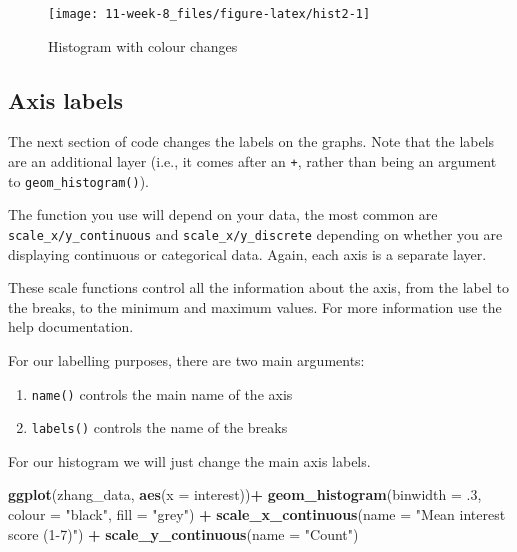 \documentclass[]{book}
\newenvironment{Shaded}{\begin{snugshade}}{\end{snugshade}}
\newcommand{\DataTypeTok}[1]{\textcolor[rgb]{0.13,0.29,0.53}{#1}}
\newcommand{\FloatTok}[1]{\textcolor[rgb]{0.00,0.00,0.81}{#1}}
\newcommand{\KeywordTok}[1]{\textcolor[rgb]{0.13,0.29,0.53}{\textbf{#1}}}
\newcommand{\NormalTok}[1]{#1}
\newcommand{\OperatorTok}[1]{\textcolor[rgb]{0.81,0.36,0.00}{\textbf{#1}}}
\newcommand{\StringTok}[1]{\textcolor[rgb]{0.31,0.60,0.02}{#1}}
\providecommand{\tightlist}{%
  \setlength{\itemsep}{0pt}\setlength{\parskip}{0pt}}
\begin{document}
\begin{figure}

{\centering \texttt{[image: 11-week-8\_files/figure-latex/hist2-1]} 

}

\caption{Histogram with colour changes}\label{fig:hist2}
\end{figure}

\hypertarget{axis-labels}{%
\subsection{Axis labels}\label{axis-labels}}

The next section of code changes the labels on the graphs. Note that the labels are an additional layer (i.e., it comes after an \texttt{+}, rather than being an argument to \texttt{geom\_histogram()}).

The function you use will depend on your data, the most common are \texttt{scale\_x/y\_continuous} and \texttt{scale\_x/y\_discrete} depending on whether you are displaying continuous or categorical data. Again, each axis is a separate layer.

These scale functions control all the information about the axis, from the label to the breaks, to the minimum and maximum values. For more information use the help documentation.

For our labelling purposes, there are two main arguments:

\begin{enumerate}
\def\labelenumi{\arabic{enumi}.}
\tightlist
\item
  \texttt{name()} controls the main name of the axis
\item
  \texttt{labels()} controls the name of the breaks
\end{enumerate}

For our histogram we will just change the main axis labels.

\begin{Shaded}
\begin{Highlighting}[]
\KeywordTok{ggplot}\NormalTok{(zhang_data, }\KeywordTok{aes}\NormalTok{(}\DataTypeTok{x =}\NormalTok{ interest))}\OperatorTok{+}\StringTok{ }
\StringTok{  }\KeywordTok{geom_histogram}\NormalTok{(}\DataTypeTok{binwidth =} \FloatTok{.3}\NormalTok{, }
                 \DataTypeTok{colour =} \StringTok{"black"}\NormalTok{,  }
                 \DataTypeTok{fill =} \StringTok{"grey"}\NormalTok{) }\OperatorTok{+}\StringTok{ }
\StringTok{  }\KeywordTok{scale_x_continuous}\NormalTok{(}\DataTypeTok{name =} \StringTok{"Mean interest score (1-7)"}\NormalTok{) }\OperatorTok{+}
\StringTok{  }\KeywordTok{scale_y_continuous}\NormalTok{(}\DataTypeTok{name =} \StringTok{"Count"}\NormalTok{) }
\end{Highlighting}
\end{Shaded}
\end{document}
